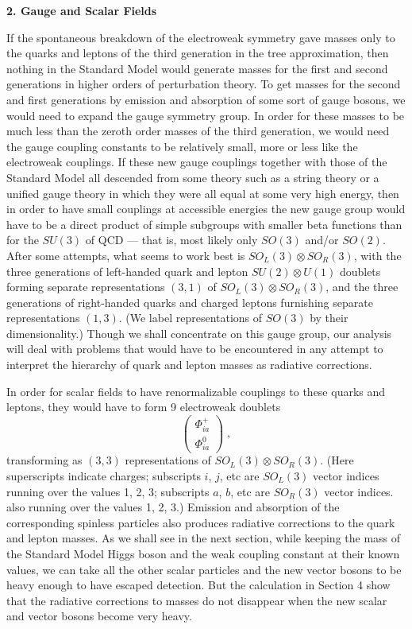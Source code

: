 \documentclass[12pt]{article}
\begin{document}
\begin{center}
{\bf 2. Gauge and Scalar Fields}
\end{center}


If the spontaneous breakdown of the electroweak symmetry gave masses only to the quarks and leptons of the third generation  in the tree approximation, then nothing in the Standard Model would generate masses for  the first and second generations in higher orders of perturbation theory.  To get masses for the second and first generations by emission and absorption of some sort of gauge bosons,  we would need to expand the gauge symmetry group.  In order for these masses to be much less than the zeroth order masses of the third generation, we would need the gauge coupling constants to be relatively small, more or less like the electroweak couplings.  If these new gauge couplings together  with those of the Standard Model all descended from some theory such as a string theory or a unified gauge theory in which they were all equal at some very high energy, then in order to have small couplings at accessible energies the new gauge group would have to be a direct product of simple subgroups with smaller beta functions than for the $SU(3)$ of QCD --- that is, most likely only $SO(3)$ and/or $SO(2)$.  After some attempts, what seems to work best is $SO_L(3)\otimes  SO_R(3)$, with the three generations of left-handed quark and lepton $SU(2)\otimes U(1)$  doublets forming  separate representations $(3,1)$ of $SO_L(3)\otimes  SO_R(3)$, and the three generations of right-handed quarks and charged leptons furnishing separate representations   $(1,3)$.  (We label representations of $SO(3)$ by their dimensionality.)  Though we shall concentrate on this gauge group, our analysis will deal with problems that would have to be encountered in any attempt to interpret the hierarchy of quark and lepton masses as radiative corrections.

In order for scalar fields to have renormalizable couplings to these quarks and leptons, they would have to form 9 electroweak doublets 
\begin{equation}
\left(\begin{array}{c} \Phi_{ia}^+\\ \Phi_{ia}^0\end{array}\right)\;,
\end{equation}
transforming as $(3,3)$ representations of $SO_L(3)\otimes  SO_R(3)$.  (Here superscripts indicate charges; subscripts $i$, $j$, etc are $SO_L(3)$ vector indices running over the values 1, 2, 3; subscripts $a$, $b$, etc are $SO_R(3)$ vector indices. also running over the values 1, 2, 3.)    Emission and absorption of the corresponding spinless particles also produces radiative corrections to the quark and lepton masses.  As we shall see in the next section, while keeping the mass of the Standard Model Higgs boson and the weak coupling constant at their known values, we can take all the other scalar particles and the new vector bosons to be  heavy enough to have escaped detection.  But the calculation in Section 4 show that the radiative corrections to masses do not disappear when the new scalar and vector bosons become very heavy.
  
\end{document}
